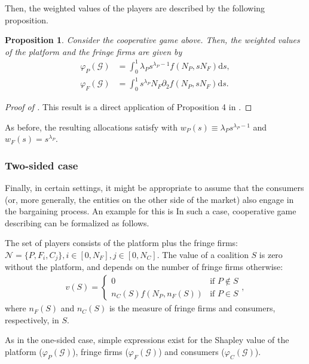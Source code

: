 \documentclass[a4paper]{article}
\newtheorem{proposition}{Proposition}
\newcommand{\ds}{\mathrm{d}s}
\begin{document}
Then, the weighted values of the players are described by the following proposition.

\begin{proposition}
    \label{prop:profit_sharing_weighted}
    Consider the cooperative game above.
    Then, the weighted values of the platform and the fringe firms are given by
    \begin{align*}
        \varphi_P(\mathcal{G}) &= \int_0^1 \lambda_P s ^ {\lambda_P - 1} f(N_P, s N_F) \ds, \\
        \varphi_F(\mathcal{G}) &= \int_0^1 s ^ {\lambda_P} N_F \partial_2 f(N_P, s N_F) \ds.
    \end{align*}
\end{proposition}
\begin{proof}[Proof of ]
    This result is a direct application of Proposition 4 in \textcite{stancsics2023value}.
\end{proof}

As before, the resulting allocations satisfy  with $w_P(s) \equiv \lambda_P s ^ {\lambda_P - 1}$ and $w_F(s) = s ^ {\lambda_P}$.


\subsubsection{Two-sided case}
\label{sec:cooperative_game_two_sided}

Finally, in certain settings, it might be appropriate to assume that the consumers (or, more generally, the entities on the other side of the market) also engage in the bargaining process.
An example for this is 
In such a case, cooperative game describing can be formalized as follows.

The set of players consists of the platform plus the fringe firms: $\mathcal{N} = \{P, F_i, C_j\}, i \in [0, N_F], j \in [0, N_C]$.
The value of a coalition $S$ is zero without the platform, and depends on the number of fringe firms otherwise:
\begin{align*}
    v(S) = \begin{cases}
        0 & \text{if } P \notin S \\
        n_C(S) f(N_P, n_F(S)) & \text{if } P \in S
    \end{cases},
\end{align*}
where $n_F(S)$ and $n_C(S)$ is the measure of fringe firms and consumers, respectively, in $S$.

As in the one-sided case, simple expressions exist for the Shapley value of the platform ($\varphi_P(\mathcal{G})$), fringe firms ($\varphi_F(\mathcal{G})$) and consumers ($\varphi_C(\mathcal{G})$).
\end{document}
